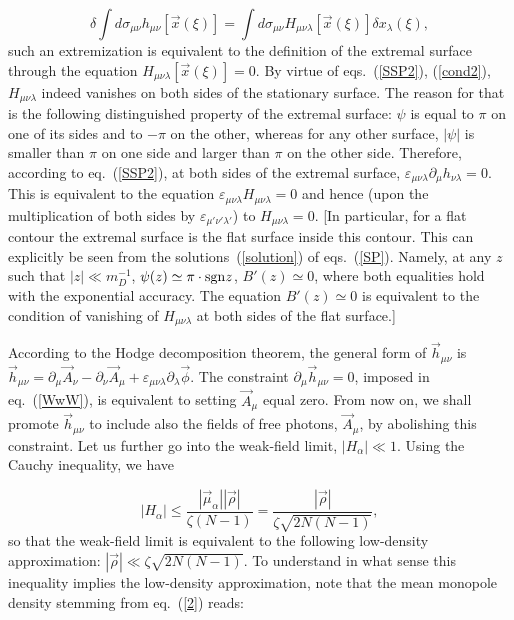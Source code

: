 \documentclass[a4paper,12pt]{article}
\begin{document}
$$
\delta\int d\sigma_{\mu\nu}h_{\mu\nu}\left[\vec x(\xi)\right]=\int d\sigma_{\mu\nu}H_{\mu\nu\lambda}\left[\vec x(\xi)\right]\delta x_\lambda(\xi),
$$
such an extremization is equivalent to the definition of the extremal surface through the equation
$H_{\mu\nu\lambda}\left[\vec x(\xi)\right]=0$. By virtue of eqs.~(\ref{SSP2}), (\ref{cond2}), $H_{\mu\nu\lambda}$
indeed vanishes on both sides of the stationary surface. The reason for that is the following
distinguished property of the extremal surface:
$\psi$ is equal to $\pi$ on one of its sides and to $-\pi$ on the other, whereas for any other surface,
$|\psi|$ is smaller than $\pi$ on one side and larger than $\pi$ on the other side. Therefore,
according to eq.~(\ref{SSP2}), at both
sides of the extremal surface, $\varepsilon_{\mu\nu\lambda}\partial_\mu h_{\nu\lambda}=0$. This is
equivalent to the
equation $\varepsilon_{\mu\nu\lambda}H_{\mu\nu\lambda}=0$ and hence (upon the multiplication of both sides by $\varepsilon_{\mu'\nu'\lambda'}$)
to $H_{\mu\nu\lambda}=0$.
[In particular, for a flat contour the extremal surface is the flat surface inside this contour.
This can explicitly be seen from the solutions~(\ref{solution}) of eqs.~(\ref{SP}). Namely, at any $z$ such that $|z|\ll m_D^{-1}$,
$\psi(z)\simeq\pi\cdot {\rm sgn} z$, $B'(z)\simeq 0$, where both equalities hold with the exponential accuracy. The equation $B'(z)\simeq 0$
is equivalent to the condition of vanishing of $H_{\mu\nu\lambda}$ at both sides of the flat surface.]

According to the Hodge decomposition theorem, the general form of $\vec h_{\mu\nu}$ is
$\vec h_{\mu\nu}=\partial_\mu\vec A_\nu-\partial_\nu\vec A_\mu+\varepsilon_{\mu\nu\lambda}\partial_\lambda\vec\phi$.
The constraint $\partial_\mu\vec h_{\mu\nu}=0$, imposed in eq.~(\ref{WwW}), is equivalent to setting $\vec A_\mu$ equal zero.
From now on, we shall promote $\vec h_{\mu\nu}$ to include also the fields of free photons, $\vec A_\mu$, by abolishing this
constraint. Let us further go into the weak-field limit, $|H_\alpha|\ll 1$. Using the Cauchy inequality, we have

$$
\left|H_\alpha\right|\le\frac{\left|\vec\mu_\alpha\right|\left|\vec\rho
\right|}{\zeta(N-1)}=
\frac{|\vec\rho|}{\zeta\sqrt{2N(N-1)}},$$
so that the weak-field limit is equivalent to the following low-density approximation: $|\vec\rho|\ll\zeta\sqrt{2N(N-1)}$.
To understand in what sense this inequality implies the low-density approximation, note that the mean monopole density stemming from eq.~(\ref{2}) reads:
\end{document}
